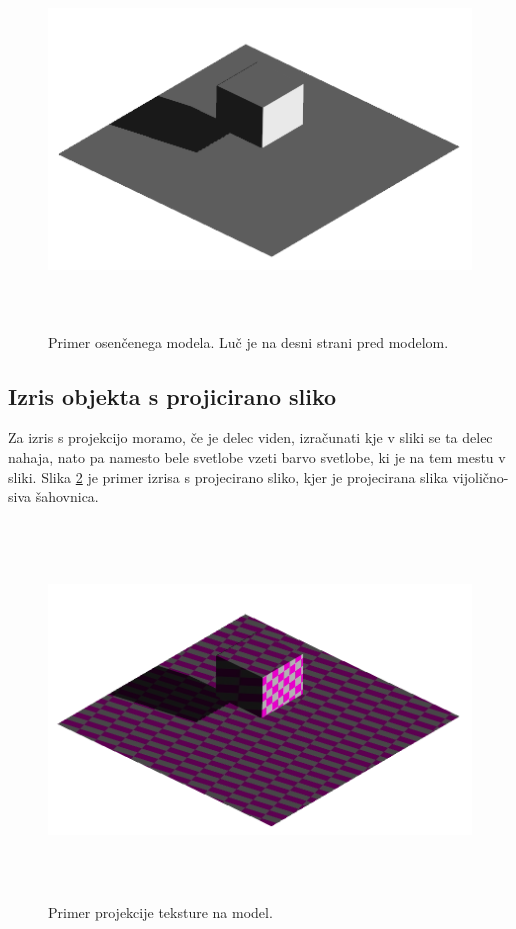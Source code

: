 \documentclass[a4paper, 12pt]{book}
\begin{document}
\begin{figure}[h]
\begin{center}
\includegraphics[width=12cm, height=10cm, keepaspectratio=true]{Osencen_model.png}
\end{center}
\caption{Primer osenčenega modela. Luč je na desni strani pred modelom.}
\label{osencenmodel}
\end{figure}

\subsection*{Izris objekta s projicirano sliko}
Za izris s projekcijo moramo, če je delec viden, izračunati kje v sliki se ta delec nahaja, nato pa namesto bele svetlobe vzeti barvo svetlobe, ki je na tem mestu v sliki. Slika \ref{teksturaprojecirananamodel} je primer izrisa s projecirano sliko, kjer je projecirana slika vijolično-siva šahovnica.

\begin{figure}[h]
\begin{center}
\includegraphics[width=12cm, height=10cm, keepaspectratio=true]{Tekstura_projecirana_na_model.png}
\end{center}
\caption{Primer projekcije teksture na model.}
\label{teksturaprojecirananamodel}
\end{figure}
\end{document}
